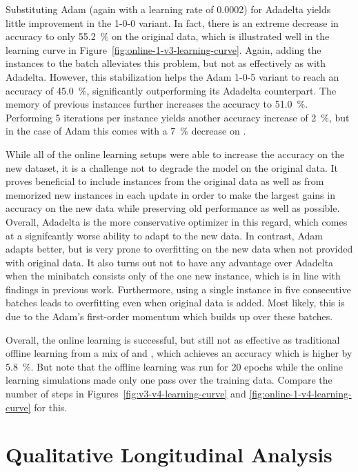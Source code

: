 Substituting Adam (again with a learning rate of \num{0.0002}) for Adadelta
yields little improvement in the 1-0-0 variant. In fact, there is an extreme
decrease in accuracy to only \SI{55.2}{\%} on the original \nlmthree{} data,
which is illustrated well in the learning curve in
Figure~\ref{fig:online-1-v3-learning-curve}. Again, adding the \nlmthree{}
instances to the batch alleviates this problem, but not as effectively as with
Adadelta. However, this stabilization helps the Adam 1-0-5 variant to reach an
\nlmfour{} accuracy of \SI{45.0}{\%}, significantly outperforming its Adadelta
counterpart. The memory of previous \nlmfour{} instances further increases the
accuracy to \SI{51.0}{\%}. Performing 5 iterations per instance yields
another accuracy increase of \SI{2}{\%}, but in the case of Adam this comes with
a \SI{7}{\%} decrease on \nlmthree{}.

While all of the online learning setups were able to increase the accuracy on
the new \nlmapsfour{} dataset, it is a challenge not to degrade the model on the
original data. It proves beneficial to include instances from the original data
as well as from memorized new instances in each update in order to make the
largest gains in accuracy on the new data while preserving old performance as
well as possible. Overall, Adadelta is the more conservative optimizer in this
regard, which comes at a signifcantly worse ability to adapt to the new data. In
contrast, Adam adapts better, but is very prone to overfitting on the new data
when not provided with original data. It also turns out not to have any
advantage over Adadelta when the minibatch consists only of the one new
instance, which is in line with findings in previous work. Furthermore, using a
single instance in five consecutive batches leads to overfitting even when
original data is added. Most likely, this is due to the Adam’s first-order
momentum which builds up over these batches.

Overall, the online learning is successful, but still not as effective as
traditional offline learning from a mix of \nlmthree{} and \nlmfour{}, which
achieves an accuracy which is higher by \SI{5.8}{\%}. But note that the offline
learning was run for \num{20} epochs while the online learning simulations made
only one pass over the training data. Compare the number of steps in
Figures~\ref{fig:v3-v4-learning-curve} and \ref{fig:online-1-v4-learning-curve}
for this.

\FloatBarrier
\section{Qualitative Longitudinal Analysis}

